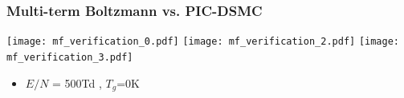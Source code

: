\documentclass[mathserif, aspectratio=169]{beamer}
\begin{document}
\begin{frame}[fragile]
\begin{center}
	\end{center}
\end{frame}



\begin{frame}
	\frametitle{Multi-term Boltzmann vs. PIC-DSMC}
	\vspace{-0.25in}
	\begin{center}
		\texttt{[image: mf\_verification\_0.pdf]}
		\texttt{[image: mf\_verification\_2.pdf]}
		\texttt{[image: mf\_verification\_3.pdf]}
	\end{center}
	\begin{itemize}
		\item $E/N$ = 500Td , $T_g$=0K
	\end{itemize}
\end{frame}


\end{document}
